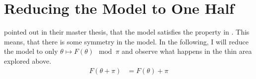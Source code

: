 \section{Reducing the Model to One Half}

 pointed out in their master thesis, that the model satisfies the property in .
This means, that there is some symmetry in the model.
In the following, I will reduce the model to only $\theta \mapsto F(\theta) \mod \pi$ and observe what happens in the thin area explored above.
\begin{align}
    F(\theta + \pi) & = F(\theta) + \pi \label{equ:yunus.property.symmetry}
\end{align}

